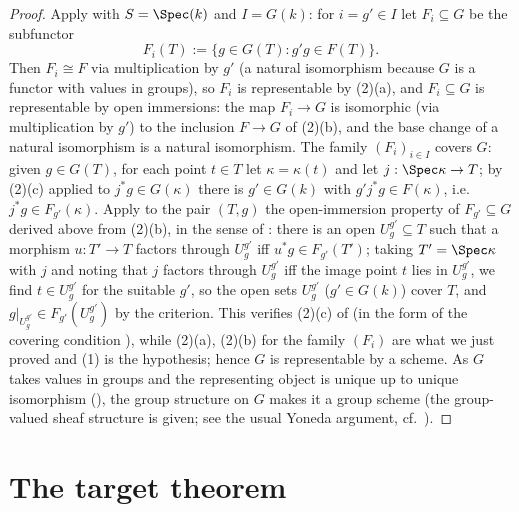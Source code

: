 \begin{proof}
Apply  with $S=\Spec(k)$ and $I=G(k)$: for
$i=g'\in I$ let $F_i\subseteq G$ be the subfunctor
\[
F_i(T):=\{g\in G(T):g'g\in F(T)\}.
\]
Then $F_i\cong F$ via multiplication by $g'$ (a natural isomorphism
because $G$ is a functor with values in groups), so $F_i$ is
representable by (2)(a), and $F_i\subseteq G$ is representable by open
immersions: the map $F_i\to G$ is isomorphic (via multiplication by
$g'$) to the inclusion $F\to G$ of (2)(b), and the base change of a
natural isomorphism is a natural isomorphism.  The family
$(F_i)_{i\in I}$ covers $G$: given $g\in G(T)$, for each point $t\in T$
let $\kappa=\kappa(t)$ and let $j:\Spec\kappa\to T$; by (2)(c) applied to
$j^*g\in G(\kappa)$ there is $g'\in G(k)$ with
$g'j^*g\in F(\kappa)$, i.e.\ $j^*g\in F_{g'}(\kappa)$.  Apply to the pair
$(T,g)$ the open-immersion property of $F_{g'}\subseteq G$ derived above
from (2)(b), in the sense of : there is an
open $U_g^{g'}\subseteq T$ such that a morphism $u:T'\to T$ factors
through $U_g^{g'}$ iff $u^*g\in F_{g'}(T')$; taking $T'=\Spec\kappa$
with $j$ and noting that $j$ factors through $U_g^{g'}$ iff the image
point $t$ lies in $U_g^{g'}$, we find $t\in U_g^{g'}$ for the suitable
$g'$, so the open sets $U_g^{g'}$ ($g'\in G(k)$) cover $T$, and
$g|_{U_g^{g'}}\in F_{g'}(U_g^{g'})$ by the criterion.  This verifies
(2)(c) of  (in the form of the covering
condition ), while (2)(a), (2)(b) for the family
$(F_i)$ are what we just proved and (1) is the hypothesis; hence $G$ is
representable by a scheme.  As $G$ takes values in groups and the
representing object is unique up to unique isomorphism
(), the group
structure on $G$ makes it a group scheme (the group-valued sheaf
structure is given; see the usual Yoneda argument, cf.\
).
\end{proof}

\section{The target theorem}\label{sec:target}

